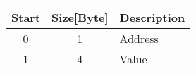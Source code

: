 	\begin{tabular}{c|c|l}
		\textbf{Start} & \textbf{Size[Byte]} & \textbf{Description} \\ \hline
		0 & 1 & Address \\ 
		1 & 4 & Value \\
	\end{tabular}